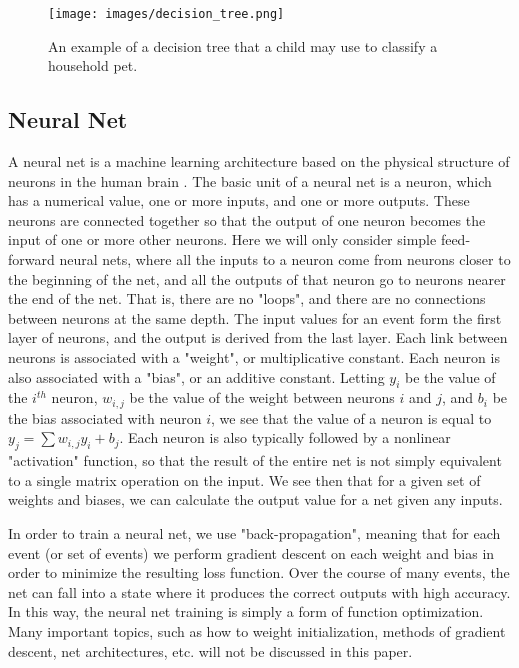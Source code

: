 \begin{figure}[t]
    \centering
    \texttt{[image: images/decision\_tree.png]}
    \caption{An example of a decision tree that a child may use to classify a household pet.}
    \label{decision_tree}
\end{figure}

\subsection*{Neural Net}

A neural net is a machine learning architecture based on the physical structure of neurons in the human brain \cite{neural_net}. The basic unit of a neural net is a neuron, which has a numerical value, one or more inputs, and one or more outputs. These neurons are connected together so that the output of one neuron becomes the input of one or more other neurons. Here we will only consider simple feed-forward neural nets, where all the inputs to a neuron come from neurons closer to the beginning of the net, and all the outputs of that neuron go to neurons nearer the end of the net. That is, there are no "loops", and there are no connections between neurons at the same depth. The input values for an event form the first layer of neurons, and the output is derived from the last layer. Each link between neurons is associated with a "weight", or multiplicative constant. Each neuron is also associated with a "bias", or an additive constant. Letting $y_i$ be the value of the $i^{th}$ neuron, $w_{i,j}$ be the value of the weight between neurons $i$ and $j$, and $b_i$ be the bias associated with neuron $i$, we see that the value of a neuron is equal to $y_j = \sum{w_{i,j}y_i} + b_j$. Each neuron is also typically followed by a nonlinear "activation" function, so that the result of the entire net is not simply equivalent to a single matrix operation on the input. We see then that for a given set of weights and biases, we can calculate the output value for a net given any inputs.

In order to train a neural net, we use "back-propagation", meaning that for each event (or set of events) we perform gradient descent on each weight and bias in order to minimize the resulting loss function. Over the course of many events, the net can fall into a state where it produces the correct outputs with high accuracy. In this way, the neural net training is simply a form of function optimization. Many important topics, such as how to weight initialization, methods of gradient descent, net architectures, etc. will not be discussed in this paper.

